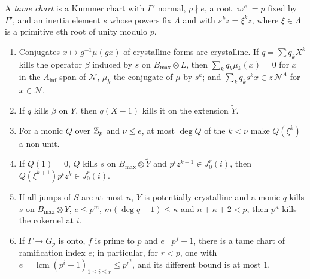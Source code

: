 \begin{lemma}\label{lem:tame-charts}
A \emph{tame chart} is a Kummer chart with $\Gamma'$ normal, $p\nmid e$, a root $\varpi^e=p$ fixed by $\Gamma'$, and an inertia element $s$ whose powers fix $\Lambda$ and with $s^kz=\xi^kz$, where $\xi\in\Lambda$ is a primitive $e$th root of unity modulo $p$.
\begin{enumerate}[label=\textup{(\alph*)}]
\item Conjugates $x\mapsto g^{-1}\mu(gx)$ of crystalline forms are crystalline. If $q=\sum q_kX^k$ kills the operator $\beta$ induced by $s$ on $B_{\max}\otimes L$, then $\sum_kq_k\mu_k(x)=0$ for $x$ in the $A_{\inf}$-span of $\mathcal N$, $\mu_k$ the conjugate of $\mu$ by $s^k$; and $\sum_kq_ks^kx\in z\,\mathcal N^A$ for $x\in\mathcal N$.
\item If $q$ kills $\beta$ on $Y$, then $q(X-1)$ kills it on the extension $\tilde Y$.
\item For a monic $Q$ over $\mathbb{Z}_p$ and $\nu\le e$, at most $\deg Q$ of the $k<\nu$ make $Q(\xi^k)$ a non-unit.
\item If $Q(1)=0$, $Q$ kills $s$ on $B_{\max}\otimes\tilde Y$ and $p^tz^{k+1}\in J^r_0(i)$, then $Q(\xi^{k+1})p^tz^k\in J^r_0(i)$.
\item If all jumps of $S$ are at most $n$, $Y$ is potentially crystalline and a monic $q$ kills $s$ on $B_{\max}\otimes Y$, $e\le p^m$, $m(\deg q+1)\le\kappa$ and $n+\kappa+2<p$, then $p^\kappa$ kills the cokernel at $i$.
\item If $\Gamma\to G_p$ is onto, $f$ is prime to $p$ and $e\mid p^f-1$, there is a tame chart of ramification index $e$; in particular, for $r<p$, one with $e=\operatorname{lcm}(p^i-1)_{1\le i\le r}\le p^{r^2}$, and its different bound is at most $1$.
\end{enumerate}
\end{lemma}

